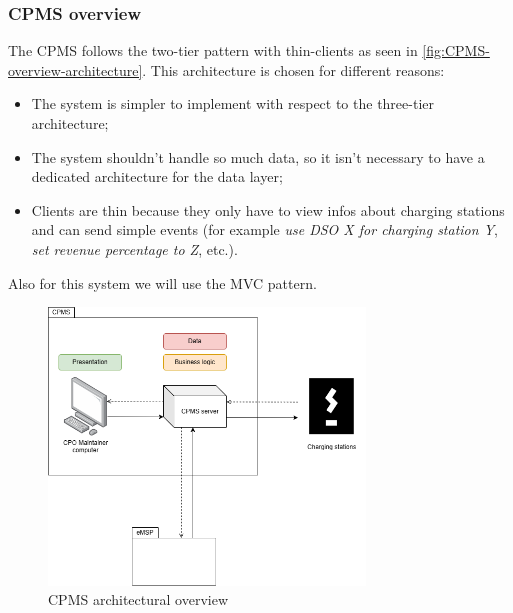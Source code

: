 
\subsubsection{\ac{CPMS} overview}
The \ac{CPMS} follows the two-tier pattern with thin-clients as seen in \autoref{fig:CPMS-overview-architecture}. This architecture is chosen for different reasons:
\begin{itemize}
    \item The system is simpler to implement with respect to the three-tier architecture;
    \item The system shouldn't handle so much data, so it isn't necessary to have a dedicated architecture for the data layer;
    \item Clients are thin because they only have to view infos about charging stations and can send simple events (for example \textit{use \ac{DSO} X for charging station Y}, \textit{set revenue percentage to Z}, etc.).
\end{itemize}
Also for this system we will use the \ac{MVC} pattern.

\begin{figure}[!h]
    \begin{center}
        \includegraphics[keepaspectratio, width=0.75\textwidth]{Graphics/DD-overview-CPMS.drawio.png}
        \caption{\ac{CPMS} architectural overview}
        \label{fig:CPMS-overview-architecture}
    \end{center}
\end{figure}


